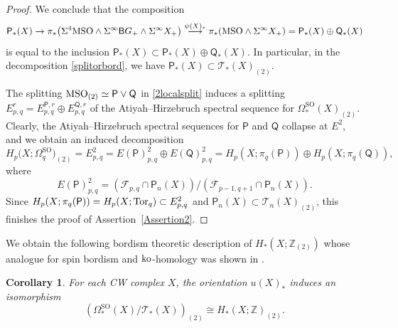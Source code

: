 \documentclass[pdftex]{sigma}
\numberwithin{equation}{section}
\newtheorem{Corollary}[Theorem]{Corollary}
\newcommand{\Z}{\mathbb{Z}}
\newcommand{\SO}{\mathrm{SO}}
\newcommand{\MSO}{{\rm MSO}}
\newcommand{\sB}{{\sf B}}
\newcommand{\Tor}{{\rm Tor}}
\begin{document}
\begin{proof}
We conclude that the composition
\[
 \mathsf{P}_*(X) \to \pi_*\big( \Sigma^4 \MSO \wedge \Sigma^{\infty} \sB G_+ \wedge \Sigma^{\infty}X_+\big) \stackrel{\psi(X)_*}{\longrightarrow} \pi_*(\MSO \wedge \Sigma^{\infty} X_+) = \mathsf{P}_*(X) \oplus \mathsf{Q}_*(X)
\]
is equal to the inclusion $ \mathsf{P}_*(X) \subset \mathsf{P}_*(X) \oplus \mathsf{Q}_*(X)$.
In particular, in the decomposition \eqref{splitorbord}, we have $\mathsf{P}_*(X) \subset \mathscr{T}_*(X)_{(2)}$.

The splitting $\MSO_{(2)} \simeq \mathsf{P} \vee \mathsf{Q}$ in \eqref{2localsplit} induces a splitting $E^r_{p,q} = E^{\mathsf{P}, r}_{p,q} \oplus E^{\mathsf{Q}, r}_{p,q}$ of the Atiyah--Hirzebruch spectral sequence for $\Omega^{\SO}_*(X)_{(2)}$.
Clearly, the Atiyah--Hirzebruch spectral sequences for $\mathsf{P}$ and $\mathsf{Q}$ collapse at $E^2$, and we obtain an induced decomposition
\[
 H_p\big(X; \Omega^{\SO}_q\big)_{(2)} = E^2_{p,q} = E(\mathsf{P})^{2}_{p,q} \oplus E(\mathsf{Q})^{2}_{p,q} = H_p(X ; \pi_q( \mathsf{P})) \oplus H_p(X ; \pi_q( \mathsf{Q})),
\]
where
\[
 E(\mathsf{P})^{2}_{p,q} = \left( \mathscr{F}_{p,q} \cap \mathsf{P}_n(X)\right) / \left( \mathscr{F}_{p-1,q+1} \cap \mathsf{P}_n(X) \right).
\]
Since $H_p(X ; \pi_q( \mathsf{P})) = H_p(X; \Tor_q) \subset E^2_{p,q}$ and $\mathsf{P}_n(X) \subset \mathscr{T}_n(X)_{(2)}$, this finishes the proof of Assertion~\ref{Assertion2}.
\end{proof}

We obtain the following bordism theoretic description of $H_*(X ; \Z_{(2)})$ whose analogue for spin bordism and ${\rm ko}$-homology was shown in \cite[Theorem B\,(2)]{Stolz_splitting}.

\begin{Corollary} For each CW complex $X$, the orientation $u(X)_*$ induces an isomorphism
\[
 \left( \Omega^{\SO}_*(X) / \mathscr{T}_*(X) \right)_{(2)} \cong H_*(X; \Z)_{(2)} .
\]
\end{Corollary}
\end{document}
